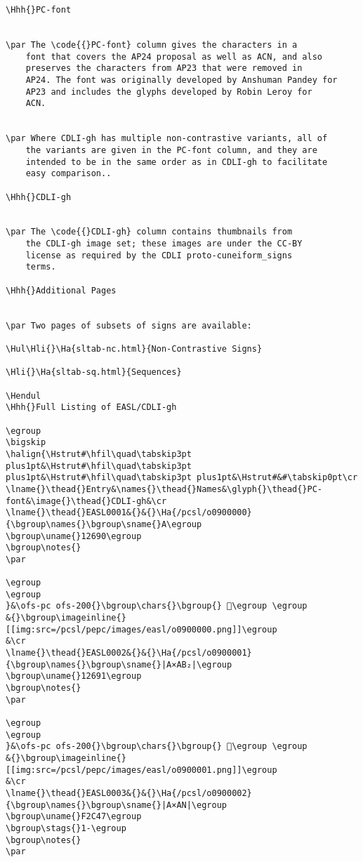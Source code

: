 \begin{verbatim}
\Hhh{}PC-font


\par The \code{{}PC-font} column gives the characters in a
	font that covers the AP24 proposal as well as ACN, and also
	preserves the characters from AP23 that were removed in
	AP24. The font was originally developed by Anshuman Pandey for
	AP23 and includes the glyphs developed by Robin Leroy for
	ACN.


\par Where CDLI-gh has multiple non-contrastive variants, all of
	the variants are given in the PC-font column, and they are
	intended to be in the same order as in CDLI-gh to facilitate
	easy comparison..

\Hhh{}CDLI-gh


\par The \code{{}CDLI-gh} column contains thumbnails from
	the CDLI-gh image set; these images are under the CC-BY
	license as required by the CDLI proto-cuneiform_signs
	terms.

\Hhh{}Additional Pages


\par Two pages of subsets of signs are available:

\Hul\Hli{}\Ha{sltab-nc.html}{Non-Contrastive Signs}

\Hli{}\Ha{sltab-sq.html}{Sequences}

\Hendul
\Hhh{}Full Listing of EASL/CDLI-gh

\egroup
\bigskip
\halign{\Hstrut#\hfil\quad\tabskip3pt plus1pt&\Hstrut#\hfil\quad\tabskip3pt plus1pt&\Hstrut#\hfil\quad\tabskip3pt plus1pt&\Hstrut#&#\tabskip0pt\cr
\lname{}\thead{}Entry&\names{}\thead{}Names&\glyph{}\thead{}PC-font&\image{}\thead{}CDLI-gh&\cr
\lname{}\thead{}EASL0001&{}&{}\Ha{/pcsl/o0900000}{\bgroup\names{}\bgroup\sname{}A\egroup
\bgroup\uname{}12690\egroup
\bgroup\notes{}
\par 

\egroup
\egroup
}&\ofs-pc ofs-200{}\bgroup\chars{}\bgroup{} 𒚐\egroup \egroup
&{}\bgroup\imageinline{}[[img:src=/pcsl/pepc/images/easl/o0900000.png]]\egroup
&\cr
\lname{}\thead{}EASL0002&{}&{}\Ha{/pcsl/o0900001}{\bgroup\names{}\bgroup\sname{}|A×AB₂|\egroup
\bgroup\uname{}12691\egroup
\bgroup\notes{}
\par 

\egroup
\egroup
}&\ofs-pc ofs-200{}\bgroup\chars{}\bgroup{} 𒚑\egroup \egroup
&{}\bgroup\imageinline{}[[img:src=/pcsl/pepc/images/easl/o0900001.png]]\egroup
&\cr
\lname{}\thead{}EASL0003&{}&{}\Ha{/pcsl/o0900002}{\bgroup\names{}\bgroup\sname{}|A×AN|\egroup
\bgroup\uname{}F2C47\egroup
\bgroup\stags{}1-\egroup
\bgroup\notes{}
\par 


\end{verbatim}
